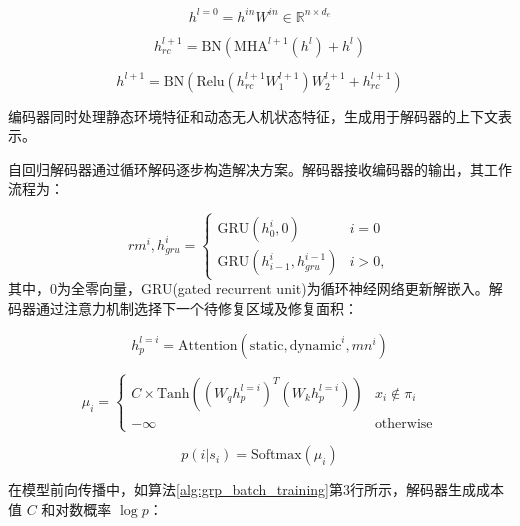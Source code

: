 \documentclass[AutoFakeBold]{LZUThesis}
\begin{document}
\begin{equation}
	h^{l=0} = h^{in} W^{in} \in \mathbb{R}^{n \times d_e}
	\label{eq:13a}
\end{equation}

\begin{equation}
	h_{rc}^{l+1} = \text{BN}\left(\text{MHA}^{l+1}(h^l) + h^l\right)
	\label{eq:13b}
\end{equation}

\begin{equation}
	h^{l+1} = \text{BN}\left(\text{Relu}\left(h_{rc}^{l+1} W_1^{l+1}\right) W_2^{l+1} + h_{rc}^{l+1}\right)
	\label{eq:13c}
\end{equation}

编码器同时处理静态环境特征和动态无人机状态特征，生成用于解码器的上下文表示。

自回归解码器通过循环解码逐步构造解决方案。解码器接收编码器的输出，其工作流程为：

\begin{equation}
	rm^{i}, h_{gru}^{i} =
	\left\{
	\begin{array}{ll}
		\text{GRU}(h_{0}^{i}, 0)               & i = 0  \\
		\text{GRU}(h_{i-1}^{i}, h_{gru}^{i-1}) & i > 0,
	\end{array}
	\right.
	\label{eq:14}
\end{equation}
其中，$0$为全零向量，GRU(gated recurrent unit)为循环神经网络更新解嵌入。解码器通过注意力机制选择下一个待修复区域及修复面积：

\begin{equation}
	h_{p}^{l=i} = \text{Attention}(\text{static}, \text{dynamic}^{i}, mn^{i})
	\label{eq:15a}
\end{equation}

\begin{equation}
	\mu_{i} =
	\begin{cases}
		C \times \text{Tanh}\left((W_{q}h_{p}^{l=i})^{T}(W_{k}h_{p}^{l=i})\right) & x_{i} \notin \pi_{i} \\
		-\infty                                                                   & \text{otherwise}
	\end{cases}
	\label{eq:15b}
\end{equation}

\begin{equation}
	p(i|s_{i}) = \text{Softmax}(\mu_{i})
	\label{eq:15c}
\end{equation}

在模型前向传播中，如算法\ref{alg:grp_batch_training}第3行所示，解码器生成成本值 $C$ 和对数概率 $\log p$：
\end{document}
